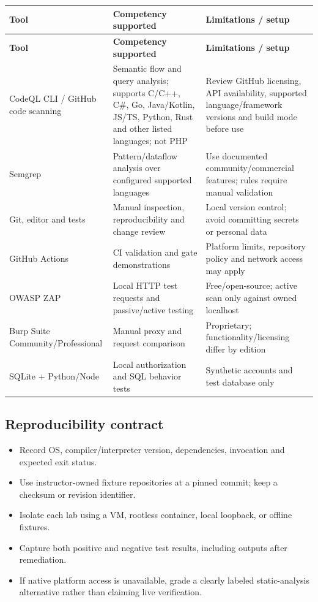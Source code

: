 \documentclass[10pt,letterpaper]{article}
\begin{document}
\begingroup\footnotesize\setlength\tabcolsep{3pt}
\begin{longtable}{>{\raggedright\arraybackslash}p{}>{\raggedright\arraybackslash}p{}>{\raggedright\arraybackslash}p{}}\toprule
\textbf{Tool} & \textbf{Competency supported} & \textbf{Limitations / setup}\\\midrule\endfirsthead
\toprule \textbf{Tool} & \textbf{Competency supported} & \textbf{Limitations / setup}\\\midrule\endhead
CodeQL CLI / GitHub code scanning & Semantic flow and query analysis; supports C/C++, C\#, Go, Java/Kotlin, JS/TS, Python, Rust and other listed languages; not PHP & Review GitHub licensing, API availability, supported language/framework versions and build mode before use\\\midrule
Semgrep & Pattern/dataflow analysis over configured supported languages & Use documented community/commercial features; rules require manual validation\\\midrule
Git, editor and tests & Manual inspection, reproducibility and change review & Local version control; avoid committing secrets or personal data\\\midrule
GitHub Actions & CI validation and gate demonstrations & Platform limits, repository policy and network access may apply\\\midrule
OWASP ZAP & Local HTTP test requests and passive/active testing & Free/open-source; active scan only against owned localhost\\\midrule
Burp Suite Community/Professional & Manual proxy and request comparison & Proprietary; functionality/licensing differ by edition\\\midrule
SQLite + Python/Node & Local authorization and SQL behavior tests & Synthetic accounts and test database only\\\midrule
\bottomrule\end{longtable}\endgroup
\subsection{Reproducibility contract}
\begin{itemize}[leftmargin=*,itemsep=2pt]
\item Record OS, compiler/interpreter version, dependencies, invocation and expected exit status.
\item Use instructor-owned fixture repositories at a pinned commit; keep a checksum or revision identifier.
\item Isolate each lab using a VM, rootless container, local loopback, or offline fixtures.
\item Capture both positive and negative test results, including outputs after remediation.
\item If native platform access is unavailable, grade a clearly labeled static-analysis alternative rather than claiming live verification.
\end{itemize}
\end{document}
